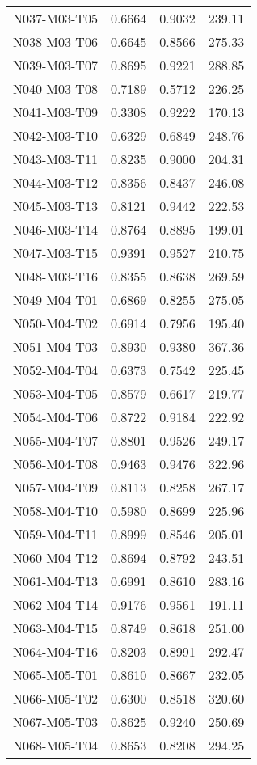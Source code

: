 \begin{longtable}[c]{|l|c|l|l|}
N037-M03-T05 & 0.6664 & 0.9032 & 239.11 \\
N038-M03-T06 & 0.6645 & 0.8566 & 275.33 \\
N039-M03-T07 & 0.8695 & 0.9221 & 288.85 \\
N040-M03-T08 & 0.7189 & 0.5712 & 226.25 \\
N041-M03-T09 & 0.3308 & 0.9222 & 170.13 \\
N042-M03-T10 & 0.6329 & 0.6849 & 248.76 \\
N043-M03-T11 & 0.8235 & 0.9000 & 204.31 \\
N044-M03-T12 & 0.8356 & 0.8437 & 246.08 \\
N045-M03-T13 & 0.8121 & 0.9442 & 222.53 \\
N046-M03-T14 & 0.8764 & 0.8895 & 199.01 \\
N047-M03-T15 & 0.9391 & 0.9527 & 210.75 \\
N048-M03-T16 & 0.8355 & 0.8638 & 269.59 \\
N049-M04-T01 & 0.6869 & 0.8255 & 275.05 \\
N050-M04-T02 & 0.6914 & 0.7956 & 195.40 \\
N051-M04-T03 & 0.8930 & 0.9380 & 367.36 \\
N052-M04-T04 & 0.6373 & 0.7542 & 225.45 \\
N053-M04-T05 & 0.8579 & 0.6617 & 219.77 \\
N054-M04-T06 & 0.8722 & 0.9184 & 222.92 \\
N055-M04-T07 & 0.8801 & 0.9526 & 249.17 \\
N056-M04-T08 & 0.9463 & 0.9476 & 322.96 \\
N057-M04-T09 & 0.8113 & 0.8258 & 267.17 \\
N058-M04-T10 & 0.5980 & 0.8699 & 225.96 \\
N059-M04-T11 & 0.8999 & 0.8546 & 205.01 \\
N060-M04-T12 & 0.8694 & 0.8792 & 243.51 \\
N061-M04-T13 & 0.6991 & 0.8610 & 283.16 \\
N062-M04-T14 & 0.9176 & 0.9561 & 191.11 \\
N063-M04-T15 & 0.8749 & 0.8618 & 251.00 \\
N064-M04-T16 & 0.8203 & 0.8991 & 292.47 \\
N065-M05-T01 & 0.8610 & 0.8667 & 232.05 \\
N066-M05-T02 & 0.6300 & 0.8518 & 320.60 \\
N067-M05-T03 & 0.8625 & 0.9240 & 250.69 \\
N068-M05-T04 & 0.8653 & 0.8208 & 294.25 \\

\end{longtable}
